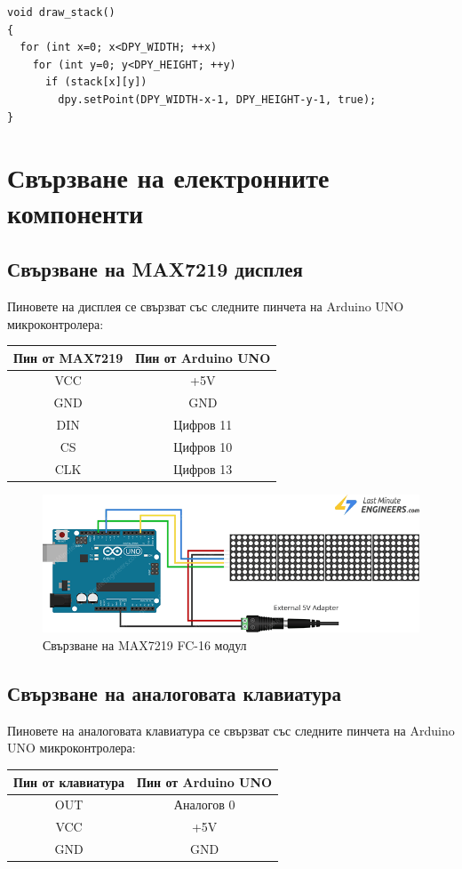 \documentclass[titlepage, oneside, 12pt]{book}
\newcommand{\ard}{Arduino\texttrademark{}}
\begin{document}
\begin{verbatim}
void draw_stack()
{
  for (int x=0; x<DPY_WIDTH; ++x)
    for (int y=0; y<DPY_HEIGHT; ++y)
      if (stack[x][y])
        dpy.setPoint(DPY_WIDTH-x-1, DPY_HEIGHT-y-1, true);
}
\end{verbatim}

\section{Свързване на електронните компоненти\label{wiring}}

\subsection{Свързване на MAX7219 дисплея}

Пиновете на дисплея се свързват със следните пинчета на \ard{} UNO микроконтролера:

\begin{center}
  \begin{tabular}{c|c}
    Пин от MAX7219 & Пин от \ard{} UNO \\ 
    \hline
    VCC & +5V \\  
    GND & GND \\  
    DIN & Цифров 11 \\  
    CS & Цифров 10 \\  
    CLK & Цифров 13
  \end{tabular}
\end{center}

\begin{figure}[h!]
    \centering
    \includegraphics[width=0.5\linewidth]{img/display_wiring.png}
    \caption{Свързване на MAX7219 FC-16 модул}
\end{figure}

\subsection{Свързване на аналоговата клавиатура}

Пиновете на аналоговата клавиатура се свързват със следните пинчета на \ard{} UNO микроконтролера:

\begin{center}
  \begin{tabular}{c|c}
    Пин от клавиатура & Пин от \ard{} UNO \\ 
    \hline
    OUT & Аналогов 0 \\  
    VCC & +5V \\  
    GND & GND
  \end{tabular}
\end{center}
\end{document}
